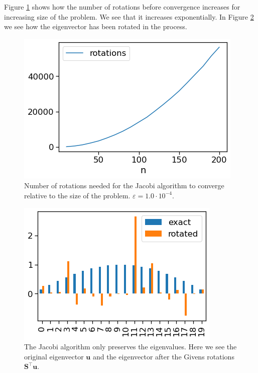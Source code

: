 \documentclass[]{article}
\begin{document}
Figure \ref{fig:rotations_for_varying_n} shows how the number of rotations before convergence increases for increasing size of the problem. We see that it increases exponentially. In Figure \ref{fig:eigenvecs} we see how the eigenvector has been rotated in the process.
\begin{figure}[!htb]
	\includegraphics[width=1\linewidth]{./results/rotations_for_varying_n.png}
	\caption{Number of rotations needed for the Jacobi algorithm to converge relative to the size of the problem. $\varepsilon = 1.0 \cdot 10^{-4}$.}
	\label{fig:rotations_for_varying_n}
\end{figure}
\begin{figure}[!htb]
	\includegraphics[width=1\linewidth]{./results/eigenvecs.png}
	\caption{The Jacobi algorithm only preserves the eigenvalues. Here we see the original eigenvector $\mathbf{u}$ and the eigenvector after the Givens rotations $\mathbf{S}^\intercal \mathbf{u}$.}
	\label{fig:eigenvecs}
\end{figure}
\end{document}
